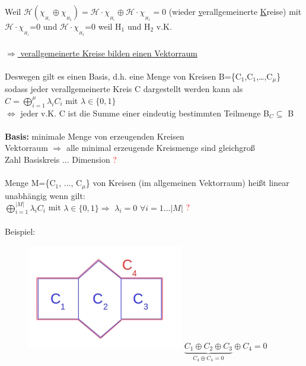 Weil $\mathcal{H} (\chi_{_{H_1}} \oplus \chi_{_{H_2}}) = \mathcal{H} \cdot \chi_{_{H_1}} \oplus \mathcal{H} \cdot \chi_{_{H_2}} = 0$ (wieder \underline{v}erallgemeinerte \underline{K}reise) mit\\
$\mathcal{H} \cdot \chi_{_{H_1}}$=0 und $\mathcal{H} \cdot \chi_{_{H_2}}$=0 weil H$_1$ und H$_2$ v.K.
\\\\
\underline{$\Rightarrow$ verallgemeinerte Kreise bilden einen Vektorraum}
\\\\
Deswegen gilt es einen Basis, d.h. eine Menge von Kreisen B=\{C$_1$,C$_1$,…,C$_{\mu}$\} sodass jeder verallgemeinerte Kreis C dargestellt werden kann als\\
$C=\bigoplus\limits_{i=1}^{\mu} \lambda_i C_i$ mit $\lambda \in \{0,1\}$
\\
$\Leftrightarrow$ jeder v.K. C ist die Summe einer eindeutig bestimmten Teilmenge B$_C \subseteq$ B
\\\\
\textbf{Basis:} minimale Menge von erzeugenden Kreisen
\\
Vektorraum $\Rightarrow$ alle minimal erzeugende Kreismenge sind gleichgroß\\
Zahl Basiskreis ... Dimension \textcolor{red}{?}
\\\\
Menge M=\{C$_1$, ..., C$_\mu$\} von Kreisen (im allgemeinen Vektorraum) heißt linear unabhängig wenn gilt:\\
$\bigoplus\limits_{i=1}^{|M|} \lambda_i C_i$ mit $\lambda \in \{0,1\}\Rightarrow$ $\lambda_i=0$ $\forall i=1 ... |M|$ \textcolor{red}{?}
\\\\
Beispiel:
\begin{figure}[htp]
\centering
\includegraphics[scale=0.75]{lectures/161104/pix/pic6.jpg}
$\underbrace{C_1 \oplus C_2 \oplus C_3}_{C_4 \oplus C_4 = 0} \oplus C_4=0$
\end{figure}

